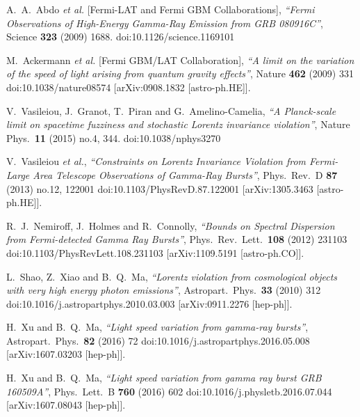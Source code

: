 \documentclass[12pt]{article}
\begin{document}
{\begin{thebibliography}{99}
  A.~A.~Abdo {\it et al.} [Fermi-LAT and Fermi GBM Collaborations],
  {\it ``Fermi Observations of High-Energy Gamma-Ray Emission from GRB 080916C''},
  Science {\bf 323} (2009) 1688.
  doi:10.1126/science.1169101

M.~Ackermann {\it et al.} [Fermi GBM/LAT Collaboration],
  {\it ``A limit on the variation of the speed of light arising from quantum gravity effects''},
  Nature {\bf 462} (2009) 331
  doi:10.1038/nature08574
  [arXiv:0908.1832 [astro-ph.HE]].

  V.~Vasileiou, J.~Granot, T.~Piran and G.~Amelino-Camelia,
  {\it ``A Planck-scale limit on spacetime fuzziness and stochastic Lorentz invariance violation''},
  Nature Phys.\  {\bf 11} (2015) no.4,  344.
  doi:10.1038/nphys3270

  V.~Vasileiou {\it et al.},
  {\it ``Constraints on Lorentz Invariance Violation from Fermi-Large Area Telescope Observations of Gamma-Ray Bursts''},
  Phys.\ Rev.\ D {\bf 87} (2013) no.12,  122001
  doi:10.1103/PhysRevD.87.122001
  [arXiv:1305.3463 [astro-ph.HE]].

  R.~J.~Nemiroff, J.~Holmes and R.~Connolly,
  {\it ``Bounds on Spectral Dispersion from Fermi-detected Gamma Ray Bursts''},
  Phys.\ Rev.\ Lett.\  {\bf 108} (2012) 231103
  doi:10.1103/PhysRevLett.108.231103
  [arXiv:1109.5191 [astro-ph.CO]].

  L.~Shao, Z.~Xiao and B.~Q.~Ma,
  {\it ``Lorentz violation from cosmological objects with very high energy photon emissions''},
  Astropart.\ Phys.\  {\bf 33} (2010) 312
  doi:10.1016/j.astropartphys.2010.03.003
  [arXiv:0911.2276 [hep-ph]].

  H.~Xu and B.~Q.~Ma,
  {\it ``Light speed variation from gamma-ray bursts''},
  Astropart.\ Phys.\  {\bf 82} (2016) 72
  doi:10.1016/j.astropartphys.2016.05.008
  [arXiv:1607.03203 [hep-ph]].

  H.~Xu and B.~Q.~Ma,
  {\it ``Light speed variation from gamma ray burst GRB 160509A''},
  Phys.\ Lett.\ B {\bf 760} (2016) 602
  doi:10.1016/j.physletb.2016.07.044
  [arXiv:1607.08043 [hep-ph]].


\end{thebibliography}}
\end{document}
